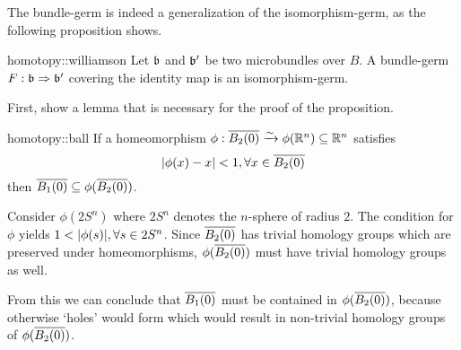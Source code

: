 \begin{myparagraph}
    The bundle-germ is indeed a generalization of the isomorphism-germ,
    as the following proposition shows.
\end{myparagraph}

\begin{myproposition}[Williamson]{homotopy::williamson}{}
    Let $\mathfrak{b}$ and $\mathfrak{b}'$ be two microbundles over $B$.
    A bundle-germ $F: \mathfrak{b} \Rightarrow{} \mathfrak{b}'$ covering the identity map is an isomorphism-germ.
\end{myproposition}

\begin{myparagraph}
    First, show a lemma that is necessary for the proof of the proposition.
\end{myparagraph}

\begin{mylemma}{homotopy::ball}{}
    If a homeomorphism $\phi: \clball[2] \isomto \phi(\R^n) \sub \R^n$ satisfies
    \[ \abs{\phi(x) - x} < 1, \forall x \in \clball[2] \]
    then $\clball[1] \sub \phi(\clball[2])$.
\end{mylemma}

\begin{myproof}
    Consider $\phi(2S^n)$ where $2S^n$ denotes the $n$-sphere of radius $2$.
    The condition for $\phi$ yields $1 < \vert{} \phi(s) \vert{}, \forall s \in 2S^n$.
    Since $\clball[2]$ has trivial homology groups which are preserved under homeomorphisms,
    $\phi(\clball[2])$ must have trivial homology groups as well.

    From this we can conclude that $\clball[1]$ must be contained in $\phi(\clball[2])$,
    because otherwise `holes' would form which would result in non-trivial homology groups of $\phi(\clball[2])$.
\end{myproof}

